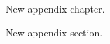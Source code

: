 \begin{justify}
    New appendix chapter.
\end{justify}

\begin{justify}
    New appendix section.
\end{justify}
